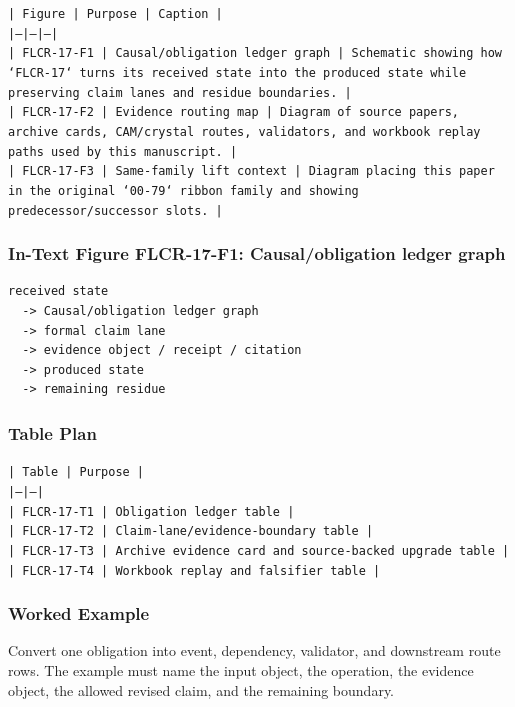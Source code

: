 \documentclass[11pt]{article}
\begin{document}
\noindent\texttt{| Figure | Purpose | Caption |}\\
\noindent\texttt{|---|---|---|}\\
\noindent\texttt{| FLCR-17-F1 | Causal/obligation ledger graph | Schematic showing how `FLCR-17` turns its received state into the produced state while preserving claim lanes and residue boundaries. |}\\
\noindent\texttt{| FLCR-17-F2 | Evidence routing map | Diagram of source papers, archive cards, CAM/crystal routes, validators, and workbook replay paths used by this manuscript. |}\\
\noindent\texttt{| FLCR-17-F3 | Same-family lift context | Diagram placing this paper in the original `00-79` ribbon family and showing predecessor/successor slots. |}\\

\subsubsection*{In-Text Figure FLCR-17-F1: Causal/obligation ledger graph}

\begin{verbatim}
received state
  -> Causal/obligation ledger graph
  -> formal claim lane
  -> evidence object / receipt / citation
  -> produced state
  -> remaining residue
\end{verbatim}

\subsubsection*{Table Plan}

\noindent\texttt{| Table | Purpose |}\\
\noindent\texttt{|---|---|}\\
\noindent\texttt{| FLCR-17-T1 | Obligation ledger table |}\\
\noindent\texttt{| FLCR-17-T2 | Claim-lane/evidence-boundary table |}\\
\noindent\texttt{| FLCR-17-T3 | Archive evidence card and source-backed upgrade table |}\\
\noindent\texttt{| FLCR-17-T4 | Workbook replay and falsifier table |}\\

\subsubsection*{Worked Example}

Convert one obligation into event, dependency, validator, and downstream route rows. The example must name the input object, the operation,
the evidence object, the allowed revised claim, and the remaining boundary.
\end{document}
